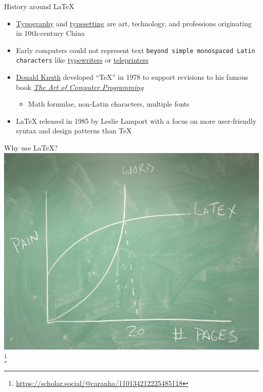 \documentclass{cubeamer}
\begin{document}
\begin{frame}{History around \LaTeX}
    \begin{itemize}
        \item \href{https://en.wikipedia.org/wiki/Typography}{Typography} and \href{https://en.wikipedia.org/wiki/Typesetting}{typesetting} are art, technology, and professions originating in 10th-century China
        \item Early computers could not represent text \texttt{beyond simple monospaced Latin characters} like \href{https://en.wikipedia.org/wiki/Typewriter}{typewriters} or \href{https://en.wikipedia.org/wiki/Teleprinter}{teleprinters}
        \item \href{https://en.wikipedia.org/wiki/Donald_Knuth}{Donald Knuth} developed ``TeX'' in 1978 to support revisions to his famous book \href{https://en.wikipedia.org/wiki/The_Art_of_Computer_Programming}{\textit{The Art of Computer Programming}}
        \begin{itemize}
            \item Math formulae, non-Latin characters, multiple fonts
        \end{itemize}
        \item \LaTeX{} released in 1985 by Leslie Lamport with a focus on more user-friendly syntax and design patterns than TeX
    \end{itemize}
\end{frame}

\begin{frame}{Why use \LaTeX?}
    \centering
    \includegraphics[width=.75\textwidth]{img/latex_vs_word.jpg}
    \footnote{\url{https://scholar.social/@caranha/110134212225485118}}
\end{frame}
\end{document}
